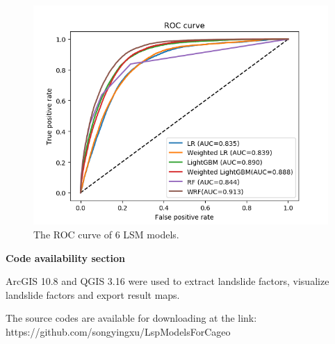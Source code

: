 \documentclass[a4paper,fleqn]{cas-sc}
\begin{document}
\begin{figure}
  \centering
  \includegraphics[width=12 cm]{Definitions/Fig_ROC_All.png}
  \caption{The ROC curve of 6 LSM models.}
  \label{Fig_ROC_All}
\end{figure} 

\newpage

\textbf{Code availability section}

ArcGIS 10.8 and QGIS 3.16 were used to extract landslide factors, visualize landslide factors and export result maps.

The source codes are available for downloading at the link:
https://github.com/songyingxu/LspModelsForCageo



 
\end{document}
